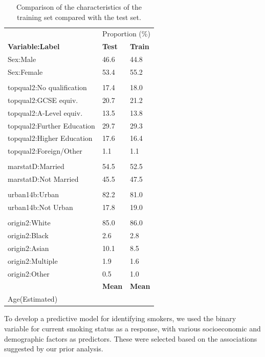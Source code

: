 \documentclass[
  11pt,
  twocolumn]{article}
\begin{document}
\begin{table}

\caption{\label{tab:outputtesttraintable}Comparison of the characteristics of the training set compared with the test set.\label{tab:output-testtrain-table}}
\centering
\fontsize{10}{12}\selectfont
\begin{tabular}[t]{l|l|l}
\hline
\multicolumn{1}{c|}{ } & \multicolumn{2}{c}{Proportion (\%)} \\
\cline{2-3}
\textbf{Variable:Label} & \textbf{Test} & \textbf{Train}\\
\hline
Sex:Male & 46.6 & 44.8\\
\hline
Sex:Female & 53.4 & 55.2\\
\hline
 &  \vphantom{3} & \\
\hline
topqual2:No qualification & 17.4 & 18.0\\
\hline
topqual2:GCSE equiv. & 20.7 & 21.2\\
\hline
topqual2:A-Level equiv. & 13.5 & 13.8\\
\hline
topqual2:Further Education & 29.7 & 29.3\\
\hline
topqual2:Higher Education & 17.6 & 16.4\\
\hline
topqual2:Foreign/Other & 1.1 & 1.1\\
\hline
 &  \vphantom{2} & \\
\hline
marstatD:Married & 54.5 & 52.5\\
\hline
marstatD:Not Married & 45.5 & 47.5\\
\hline
 &  \vphantom{1} & \\
\hline
urban14b:Urban & 82.2 & 81.0\\
\hline
urban14b:Not Urban & 17.8 & 19.0\\
\hline
 &  & \\
\hline
origin2:White & 85.0 & 86.0\\
\hline
origin2:Black & 2.6 & 2.8\\
\hline
origin2:Asian & 10.1 & 8.5\\
\hline
origin2:Multiple & 1.9 & 1.6\\
\hline
origin2:Other & 0.5 & 1.0\\
\hline
\textbf{} & \textbf{Mean} & \textbf{Mean}\\
\hline
Age(Estimated) &  & \\
\hline
\end{tabular}
\end{table}

To develop a predictive model for identifying smokers, we used the
binary variable for current smoking status as a response, with various
socioeconomic and demographic factors as predictors. These were selected
based on the associations suggested by our prior analysis.
\end{document}
